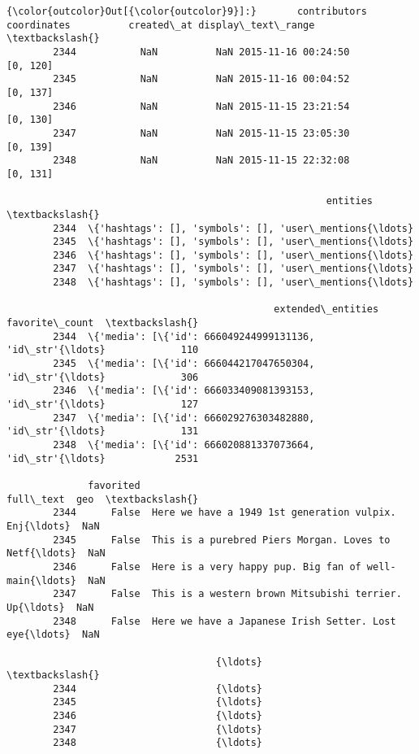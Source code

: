 \documentclass[11pt]{article}
\begin{document}
\begin{Verbatim}[commandchars=\\\{\}]
{\color{outcolor}Out[{\color{outcolor}9}]:}       contributors  coordinates          created\_at display\_text\_range  \textbackslash{}
        2344           NaN          NaN 2015-11-16 00:24:50           [0, 120]   
        2345           NaN          NaN 2015-11-16 00:04:52           [0, 137]   
        2346           NaN          NaN 2015-11-15 23:21:54           [0, 130]   
        2347           NaN          NaN 2015-11-15 23:05:30           [0, 139]   
        2348           NaN          NaN 2015-11-15 22:32:08           [0, 131]   
        
                                                       entities  \textbackslash{}
        2344  \{'hashtags': [], 'symbols': [], 'user\_mentions{\ldots}   
        2345  \{'hashtags': [], 'symbols': [], 'user\_mentions{\ldots}   
        2346  \{'hashtags': [], 'symbols': [], 'user\_mentions{\ldots}   
        2347  \{'hashtags': [], 'symbols': [], 'user\_mentions{\ldots}   
        2348  \{'hashtags': [], 'symbols': [], 'user\_mentions{\ldots}   
        
                                              extended\_entities  favorite\_count  \textbackslash{}
        2344  \{'media': [\{'id': 666049244999131136, 'id\_str'{\ldots}             110   
        2345  \{'media': [\{'id': 666044217047650304, 'id\_str'{\ldots}             306   
        2346  \{'media': [\{'id': 666033409081393153, 'id\_str'{\ldots}             127   
        2347  \{'media': [\{'id': 666029276303482880, 'id\_str'{\ldots}             131   
        2348  \{'media': [\{'id': 666020881337073664, 'id\_str'{\ldots}            2531   
        
              favorited                                          full\_text  geo  \textbackslash{}
        2344      False  Here we have a 1949 1st generation vulpix. Enj{\ldots}  NaN   
        2345      False  This is a purebred Piers Morgan. Loves to Netf{\ldots}  NaN   
        2346      False  Here is a very happy pup. Big fan of well-main{\ldots}  NaN   
        2347      False  This is a western brown Mitsubishi terrier. Up{\ldots}  NaN   
        2348      False  Here we have a Japanese Irish Setter. Lost eye{\ldots}  NaN   
        
                                    {\ldots}                          \textbackslash{}
        2344                        {\ldots}                           
        2345                        {\ldots}                           
        2346                        {\ldots}                           
        2347                        {\ldots}                           
        2348                        {\ldots}                           
        

\end{Verbatim}
\end{document}
